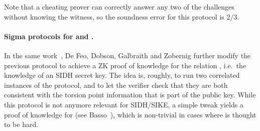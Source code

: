 Note that a cheating prover can correctly answer any two of the challenges without knowing the witness, so the soundness error for this protocol is $2/3$.



\paragraph{Sigma protocols for \R[SIDH] and \R[M-SIDH].}
In the same work~\cite{DFDGZ21}, De Feo, Dobson, Galbraith and Zobernig further modify the previous protocol to achieve a ZK proof of knowledge for the relation \R[SIDH], i.e.\ the knowledge of an SIDH secret key.
The idea is, roughly, to run two correlated instances of the protocol, and to let the verifier check that they are both consistent with the torsion point information that is part of the public key.
While this protocol is not anymore relevant for SIDH/SIKE, a simple tweak yields a proof of knowledge for \R[M-SIDH] (see Basso~\cite{Bas23}), which is non-trivial in cases where \R[M-SIDH] is thought to be hard.

